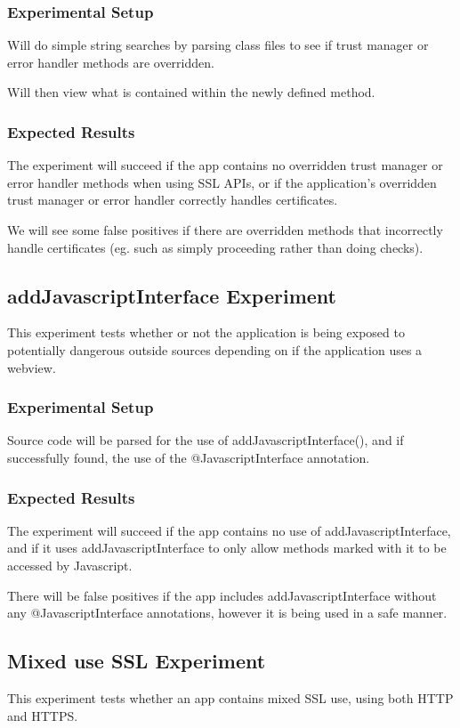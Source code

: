 \documentclass[10pt,twocolumn,pdftex]{article}
\begin{document}
    \subsubsection{Experimental Setup}
    Will do simple string searches by parsing class files to see if trust manager or error handler methods are overridden.
    
    Will then view what is contained within the newly defined method. 

    \subsubsection{Expected Results}
    The experiment will succeed if the app contains no overridden trust manager or error handler methods when using SSL APIs, or if the application's overridden trust manager or error handler correctly handles certificates.

    We will see some false positives if there are overridden methods that incorrectly handle certificates (eg. such as simply proceeding rather than doing checks).


\subsection{addJavascriptInterface Experiment}
This experiment tests whether or not the application is being exposed to potentially dangerous outside sources depending on if the application uses a webview.

    \subsubsection{Experimental Setup}
    Source code will be parsed for the use of addJavascriptInterface(), and if successfully found, the use of the @JavascriptInterface annotation.

    \subsubsection{Expected Results}
    The experiment will succeed if the app contains no use of addJavascriptInterface, and if it uses addJavascriptInterface to only allow methods marked with it to be accessed by Javascript.

    There will be false positives if the app includes addJavascriptInterface without any @JavascriptInterface annotations, however it is being used in a safe manner.


\subsection{Mixed use SSL Experiment}
    This experiment tests whether an app contains mixed SSL use, using both HTTP and HTTPS. 
    
\end{document}
